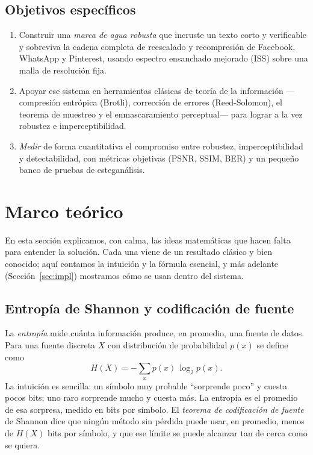 \documentclass[12pt,a4paper]{article}
\renewcommand{\nobreakdash}{}
\begin{document}
\subsection*{Objetivos específicos}
\begin{enumerate}[label=\textbf{\arabic*.}, leftmargin=2.2em]
\item Construir una \emph{marca de agua robusta} que incruste un texto corto y verificable y
sobreviva la cadena completa de reescalado y recompresión de Facebook, WhatsApp y Pinterest,
usando espectro ensanchado mejorado (ISS) sobre una malla de resolución fija.
\item Apoyar ese sistema en herramientas clásicas de teoría de la información ---compresión
entrópica (Brotli), corrección de errores (Reed\nobreakdash-Solomon), el teorema de muestreo
y el enmascaramiento perceptual--- para lograr a la vez robustez e imperceptibilidad.
\item \emph{Medir} de forma cuantitativa el compromiso entre robustez, imperceptibilidad
y detectabilidad, con métricas objetivas (PSNR, SSIM, BER) y un pequeño banco de pruebas
de esteganálisis.
\end{enumerate}

\section{Marco teórico}

En esta sección explicamos, con calma, las ideas matemáticas que hacen falta para
entender la solución. Cada una viene de un resultado clásico y bien conocido; aquí
contamos la intuición y la fórmula esencial, y más adelante (Sección~\ref{sec:impl})
mostramos cómo se usan dentro del sistema.

\subsection{Entropía de Shannon y codificación de fuente}

La \emph{entropía} mide cuánta información produce, en promedio, una fuente de datos.
Para una fuente discreta $X$ con distribución de probabilidad $p(x)$ se define como
\begin{equation}
H(X) = -\sum_{x} p(x)\,\log_2 p(x).
\end{equation}
La intuición es sencilla: un símbolo muy probable ``sorprende poco'' y cuesta pocos bits;
uno raro sorprende mucho y cuesta más. La entropía es el promedio de esa sorpresa, medido
en bits por símbolo. El \emph{teorema de codificación de fuente} de Shannon
\cite{shannon1948} dice que ningún método sin pérdida puede usar, en promedio, menos de
$H(X)$ bits por símbolo, y que ese límite se puede alcanzar tan de cerca como se quiera.
\end{document}

